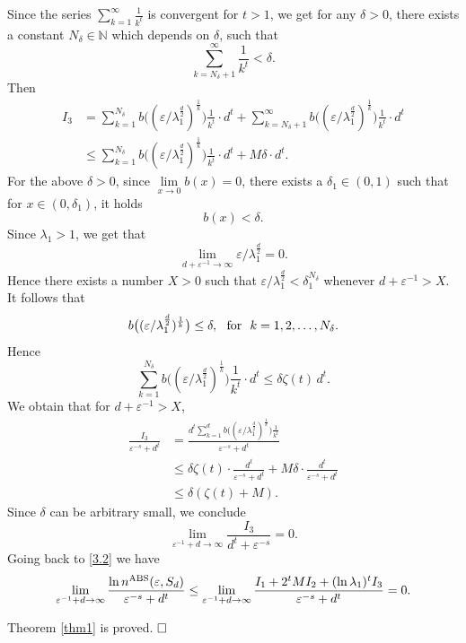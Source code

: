 \documentclass{amsart}
\numberwithin{equation}{section}
\def\vz{\varepsilon}
\def\lz{\lambda}
\newcommand{\NN}{\mathbb{N}}
\def\NN{{\mathbb N}}
\begin{document}
Since the series $\sum_{k=1}^{\infty}\frac{1}{k^t}$ is convergent
for $t>1$, we get for any $\delta>0$, there exists a constant
$N_\delta\in\NN$ which depends on $\delta$, such that
$$\sum_{k=N_\delta+1}^{\infty}\frac{1}{k^t}<\delta.$$
Then
\begin{align*}
I_3&=
\sum\limits_{k=1}^{N_\delta}b\big((\vz/\lz_1^{\frac{d}{2}})^{\frac{1}{k}}\big)
\frac{1}{k^t}\cdot d^t +\sum\limits_{k=N_\delta+1}^{\infty}
b\big((\vz/\lz_1^{\frac{d}{2}})^{\frac{1}{k}}\big)\frac{1}{k^t}\cdot d^t\\
     &\le \sum\limits_{k=1}^{N_\delta}
     b\big((\vz/\lz_1^{\frac{d}{2}})^{\frac{1}{k}}\big)\frac{1}{k^t}\cdot d^t+M\delta\cdot d^t.
\end{align*}
For the above $\delta>0$, since $\lim\limits_{x\to0}b(x)=0$, there
exists a $\delta_1\in(0,1)$ such that  for  $x\in (0,\delta_1)$,
it holds
$$b(x)<\delta.$$
Since $\lz_1>1$, we get  that
$$\lim_{d+\vz^{-1}\to\infty}\vz/\lz_1^{\frac{d}{2}}=0.$$
Hence  there exists a number $X>0$ such that
$\vz/\lz_1^{\frac{d}{2}}<\delta_1^{N_\delta}$ whenever
$d+\vz^{-1}>X$. It follows that
$$b\big((\vz/\lz_1^{\frac{d}{2}})^{\frac{1}{k}}\big)\le \delta, \ \ {\rm for }\ \ k=1, 2, \dots , N_\delta.$$
Hence$$\sum\limits_{k=1}^{N_\delta}
b\big((\vz/\lz_1^{\frac{d}{2}})^{\frac{1}{k}}\big)\frac{1}{k^t}
\cdot d^t \le \delta\zeta(t)\, d^t.$$ We obtain that  for
$d+\vz^{-1}>X$,
\begin{align*}
\frac{I_3}{\vz^{-s}+d^t }&=\frac{d^t\sum\limits_{k=1}^{d}b\big((\vz/\lz_1^{\frac{d}{2}})^{\frac{1}{k}}\big)\frac{1}{k^t}}
{\vz^{-s}+d^t }
\\ & \le \delta\zeta(t)
\cdot \frac{d^t}{\vz^{-s}+d^t }+M\delta\cdot\frac {d^t}{\vz^{-s}+d^t }\\
&\le \delta(\zeta(t)+M).
\end{align*}
Since $\delta$ can be arbitrary small, we conclude
$$\lim_{\varepsilon^{-1}+d \rightarrow \infty} \frac{I_3}{d^t +
\varepsilon^{-s}}=0.$$ Going back to \eqref{3.2} we have
\begin{align*}
\lim_{\varepsilon^{-1}+d \rightarrow \infty} \frac{\ln n^{\rm
ABS}(\varepsilon, S_{d})}{\varepsilon^{-s}+d^t } \le
\lim_{\varepsilon^{-1}+d \rightarrow \infty}\frac{I_1+2^tMI_2+
(\ln \lz_1)^tI_3}{\vz^{-s}+d^t }=0.
\end{align*}

 Theorem \ref{thm1} is proved. $\hfill\Box$
\end{document}
